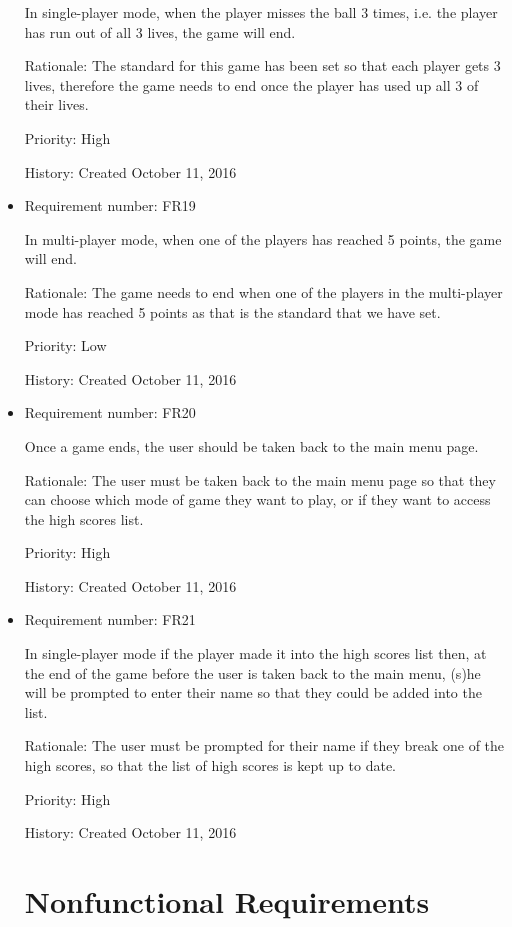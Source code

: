 \documentclass[12pt,letterpaper]{article}
\begin{document}
\begin{itemize}
		In single-player mode, when the player misses the ball 3 times, i.e. the player has run out of all 3 lives, the game will end.

		Rationale: The standard for this game has been set so that each player gets 3 lives, therefore the game needs to end once the player has used up all 3 of their lives.

		Priority: High

		History: Created October 11, 2016

		\item Requirement number: FR19

		In multi-player mode, when one of the players has reached 5 points, the game will end.

		Rationale: The game needs to end when one of the players in the multi-player mode has reached 5 points as that is the standard that we have set.

		Priority: Low

		History: Created October 11, 2016

		\item Requirement number: FR20
	
		Once a game ends, the user should be taken back to the main menu page.

		Rationale: The user must be taken back to the main menu page so that they can choose which mode of game they want to play, or if they want to access the high scores list.

		Priority: High

		History: Created October 11, 2016

		\item Requirement number: FR21

		In single-player mode if the player made it into the high scores list then, at the end of the game before the user is taken back to the main menu, (s)he will be prompted to enter their name so that they could be added into the list.

		Rationale: The user must be prompted for their name if they break one of the high scores, so that the list of high scores is kept up to date.

		Priority: High

		History: Created October 11, 2016

		
		

	\section{Nonfunctional Requirements}

\end{itemize}
\end{document}
